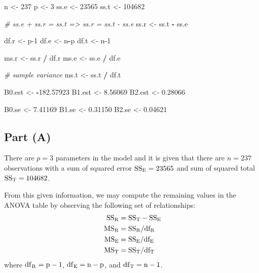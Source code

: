 \documentclass[
]{article}
\newenvironment{Shaded}{\begin{snugshade}}{\end{snugshade}}
\newcommand{\CommentTok}[1]{\textcolor[rgb]{0.56,0.35,0.01}{\textit{#1}}}
\newcommand{\DecValTok}[1]{\textcolor[rgb]{0.00,0.00,0.81}{#1}}
\newcommand{\FloatTok}[1]{\textcolor[rgb]{0.00,0.00,0.81}{#1}}
\newcommand{\NormalTok}[1]{#1}
\newcommand{\OtherTok}[1]{\textcolor[rgb]{0.56,0.35,0.01}{#1}}
\newcommand{\SpecialCharTok}[1]{\textcolor[rgb]{0.81,0.36,0.00}{\textbf{#1}}}
\begin{document}
\begin{Shaded}
\begin{Highlighting}[]
\NormalTok{n }\OtherTok{\textless{}{-}} \DecValTok{237}
\NormalTok{p }\OtherTok{\textless{}{-}} \DecValTok{3}
\NormalTok{ss.e }\OtherTok{\textless{}{-}} \DecValTok{23565}
\NormalTok{ss.t }\OtherTok{\textless{}{-}} \DecValTok{104682}

\CommentTok{\# ss.e + ss.r = ss.t =\textgreater{} ss.r = ss.t {-} ss.e}
\NormalTok{ss.r }\OtherTok{\textless{}{-}}\NormalTok{ ss.t }\SpecialCharTok{{-}}\NormalTok{ ss.e}

\NormalTok{df.r }\OtherTok{\textless{}{-}}\NormalTok{ p}\DecValTok{{-}1}
\NormalTok{df.e }\OtherTok{\textless{}{-}}\NormalTok{ n}\SpecialCharTok{{-}}\NormalTok{p}
\NormalTok{df.t }\OtherTok{\textless{}{-}}\NormalTok{ n}\DecValTok{{-}1}

\NormalTok{ms.r }\OtherTok{\textless{}{-}}\NormalTok{ ss.r }\SpecialCharTok{/}\NormalTok{ df.r}
\NormalTok{ms.e }\OtherTok{\textless{}{-}}\NormalTok{ ss.e }\SpecialCharTok{/}\NormalTok{ df.e}

\CommentTok{\# sample variance}
\NormalTok{ms.t }\OtherTok{\textless{}{-}}\NormalTok{ ss.t }\SpecialCharTok{/}\NormalTok{ df.t}

\NormalTok{B0.est }\OtherTok{\textless{}{-}} \SpecialCharTok{{-}}\FloatTok{182.57923}
\NormalTok{B1.est }\OtherTok{\textless{}{-}} \FloatTok{8.56069}
\NormalTok{B2.est }\OtherTok{\textless{}{-}} \FloatTok{0.28066}

\NormalTok{B0.se }\OtherTok{\textless{}{-}} \FloatTok{7.41169}
\NormalTok{B1.se }\OtherTok{\textless{}{-}} \FloatTok{0.31150}
\NormalTok{B2.se }\OtherTok{\textless{}{-}} \FloatTok{0.04621}
\end{Highlighting}
\end{Shaded}

\hypertarget{part-a-1}{%
\subsection{Part (A)}\label{part-a-1}}


There are \(p = 3\) parameters in the model and it is given that there
are \(n = 237\) observations with a sum of squared error
\(\rm{SS_E} = 23565\) and sum of squared total \(\rm{SS_T} = 104682\).

From this given information, we may compute the remaining values in the
ANOVA table by observing the following set of relationships:
\begin{align*}
   \rm{SS_R} &= \rm{SS_T} - \rm{SS_E}\\
   \rm{MS_R} &= \rm{SS_R} / \rm{df_R}\\
   \rm{MS_E} &= \rm{SS_E} / \rm{df_E}\\
   \rm{MS_T} &= \rm{SS_T} / \rm{df_T}
\end{align*} where \(\rm{df}_R = p-1\), \(\rm{df}_E = n-p\), and
\(\rm{df}_T = n-1\).
\end{document}
